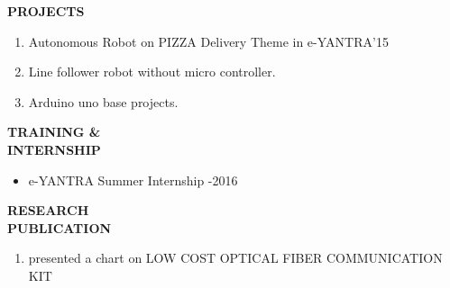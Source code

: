 \documentclass{article}
\begin{document}
 \begin{flushleft} 
 	\vspace{0.2in}
 	\textbf{PROJECTS}
 	\begin{enumerate}
 		\vspace{-0.29in}
 		\addtolength{\itemindent}{1.359in}
 		\item  Autonomous Robot on PIZZA Delivery Theme in e-YANTRA'15
 		\item  Line follower robot without micro controller.
 		\item  Arduino uno base projects.
 	\end{enumerate}
 \end{flushleft}
 
 \begin{flushleft} 
 	\vspace{0.4in}
 	\textbf{TRAINING \& \\ INTERNSHIP}
 	\begin{itemize}
 		\vspace{-0.44in}
 		\addtolength{\itemindent}{1.359in}
 		\item  e-YANTRA Summer Internship -2016
 	\end{itemize}
 \end{flushleft}
 
  \begin{flushleft} 
  	\vspace{0.4in}
  	\textbf{RESEARCH \\ PUBLICATION}
  	\begin{enumerate}
  		\vspace{-0.45in}
  		\addtolength{\itemindent}{1.359in}
  		\item  presented a chart on LOW COST OPTICAL FIBER COMMUNICATION KIT
  	\end{enumerate}
  \end{flushleft}
  
\end{document}
